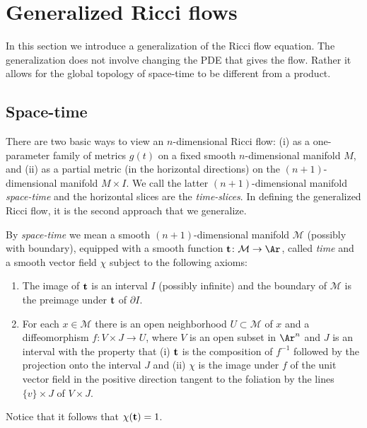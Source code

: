 \section{Generalized Ricci flows}

In this section we introduce a generalization of the Ricci flow
equation. The generalization does not involve changing the PDE that
gives the flow. Rather it allows for the global topology of
space-time to be different from a product.
\subsection{Space-time}

There are two basic ways to view an $n$-dimensional Ricci flow: (i)
as a one-parameter family of metrics $g(t)$ on a fixed smooth
$n$-dimensional manifold $M$, and (ii) as a partial metric (in the
horizontal directions) on the $(n+1)$-dimensional manifold $M\times
I$. We call the latter $(n+1)$-dimensional manifold {\sl
space-time} and the
horizontal slices are the {\em time-slices}. In defining the
generalized Ricci flow, it is the second approach that we
generalize.

\begin{definition}\label{def:generalized-spacetime}
By {\em space-time} we mean a smooth $(n+1)$-dimensional manifold
${\mathcal M}$ (possibly with boundary), equipped with a smooth
function ${\bf t}\colon {\mathcal M}\to \Ar$, called {\em time} and
a smooth vector field $\chi$ subject to the following axioms:
\begin{enumerate}
\item The image of ${\bf t}$ is an interval $I$ (possibly infinite) and
the boundary of ${\mathcal M}$ is the preimage under ${\bf t}$ of
$\partial I$.
\item For each $x\in {\mathcal M}$ there is an open neighborhood $U\subset
{\mathcal M}$ of $x$ and a diffeomorphism $f\colon  V\times J\to U$,
where $V$ is an open subset in $\Ar ^n$ and $J$ is an interval with
the property that (i) ${\bf t}$ is the composition of $f^{-1}$
followed by the projection onto the interval $J$ and (ii) $\chi$ is
the image under $f$ of the unit vector field in the positive
direction tangent to the foliation by the lines $\{v\}\times J$ of
$V\times J$.
\end{enumerate}
\end{definition}

 Notice that it follows
that $\chi({\bf t})=1$.




